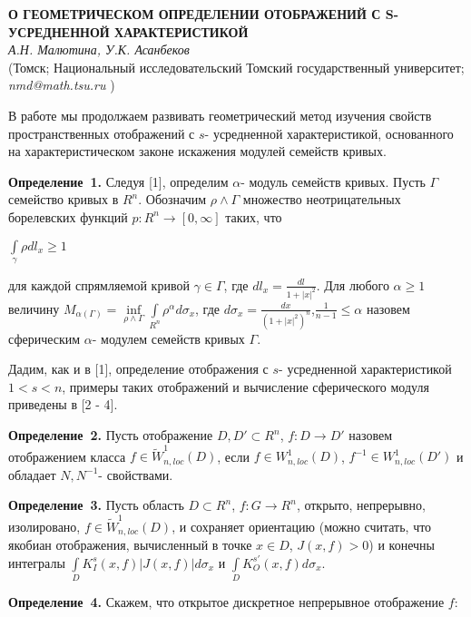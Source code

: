 \begin{center}{ \bf  О ГЕОМЕТРИЧЕСКОМ ОПРЕДЕЛЕНИИ ОТОБРАЖЕНИЙ С S- УСРЕДНЕННОЙ ХАРАКТЕРИСТИКОЙ}\\
{\it А.Н. Малютина, У.К. Асанбеков } \\
(Томск; Национальный исследовательский Томский государственный университет; {\it nmd@math.tsu.ru} )
\end{center}


В работе мы продолжаем развивать геометрический метод изучения свойств пространственных отображений с $s$- усредненной характеристикой, основанного на характеристическом законе искажения модулей семейств кривых.

\textbf{Определение~1.} Следуя [1], определим $\alpha$- модуль семейств кривых. Пусть $\Gamma$ семейство кривых в $R^{n}$. Обозначим $\rho\wedge\Gamma$ множество неотрицательных борелевских функций $p:R^{n}\rightarrow[0,\infty]$ таких, что
\begin{center}
	$\int\limits_{\gamma}\rho dl_{x}\geqslant1$
\end{center}

для каждой спрямляемой кривой $\gamma\in\Gamma$, где $dl_{x}=\frac{dl}{1+|x|^{2}}$. Для любого $\alpha\geqslant1$ величину	 $M_{\alpha(\Gamma)}=\inf\limits_{\rho\wedge\Gamma}\int\limits_{R^{n}}\rho^{\alpha}d\sigma_{x}$, где $d\sigma_{x}=\frac{dx}{(1+|x|^{2})^{n}}$,$\frac{1}{n-1}\leqslant\alpha$ назовем сферическим $\alpha$- модулем семейств кривых $\Gamma$.


Дадим, как и в [1], определение отображения с $s$- усредненной характеристикой $1<s<n$, примеры таких отображений и вычисление сферического модуля приведены в [2 - 4].

\textbf{Определение~2.} Пусть отображение $D, D'\subset R^{n}$, $f:D\rightarrow D'$ назовем отображением класса $f\in\tilde{W}^{1}_{n,loc}(D)$, если $f\in W^{1}_{n,loc}(D)$, $f^{-1}\in W^{1}_{n,loc}(D')$ и обладает $N,N^{-1}$- свойствами.


\textbf{Определение~3.} Пусть область $D\subset R^{n}$, $f:G\rightarrow R^{n}$, открыто, непрерывно, изолировано, $f\in\tilde{W}^{1}_{n,loc}(D)$, и сохраняет ориентацию (можно считать, что якобиан отображения, вычисленный в точке $x\in D$, $J(x,f)>0$) и конечны интегралы $\int\limits_{D}K_{I}^{s}(x,f)|J(x,f)|d\sigma_{x}$ и $\int\limits_{D}K_{O}^{s'}(x,f)d\sigma_{x}$.


\textbf{Определение~4.} Скажем, что открытое дискретное непрерывное отображение $f$:

